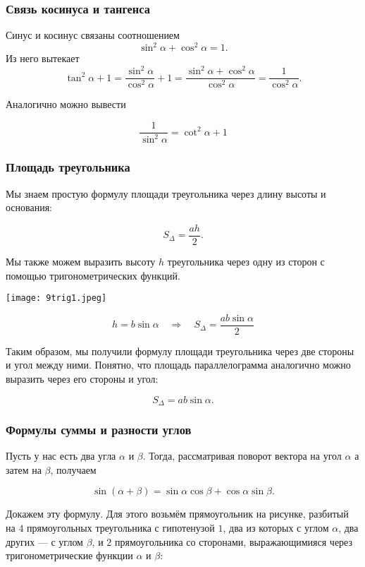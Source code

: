 \documentclass[12pt, a4paper]{article}%
\begin{document}
\subsubsection*{Связь косинуса и тангенса}
Синус и косинус связаны соотношением  
\[
\sin^2\alpha + \cos^2\alpha = 1.
\]
Из него вытекает  
\[
\tan^2\alpha + 1 = \frac{\sin^2\alpha}{\cos^2\alpha} + 1 = \frac{\sin^2\alpha + \cos^2\alpha}{\cos^2\alpha} = \frac{1}{\cos^2\alpha}.
\]

Аналогично можно вывести

\[
\frac{1}{\sin^2\alpha} = \cot^2\alpha + 1
\]

\subsubsection*{Площадь треугольника}

Мы знаем простую формулу площади треугольника через длину высоты и основания:

\[
S_\Delta = \frac{ah}{2}.
\]

Мы также можем выразить высоту $h$ треугольника через одну из сторон с помощью тригонометрических функций.

\begin{center}
\texttt{[image: 9trig1.jpeg]}
\label{fig:mpr}
\end{center}

\[
h = b\sin\alpha 
\quad\Longrightarrow\quad
S_\Delta = \frac{ab\sin\alpha}{2}
\]

Таким образом, мы получили формулу площади треугольника через две стороны и угол между ними. Понятно, что площадь параллелограмма аналогично можно выразить через его стороны и угол:

\[
S_\Delta = ab\sin\alpha.
\]


\subsubsection*{Формулы суммы и разности углов}
Пусть у нас есть два угла $\alpha$ и $\beta$. Тогда, рассматривая поворот вектора на угол $\alpha$ а затем на $\beta$, получаем

\[
\sin(\alpha + \beta) = \sin\alpha\cos\beta + \cos\alpha\sin\beta.
\]


Докажем эту формулу. Для этого возьмём прямоугольник на рисунке, разбитый на $4$ 
прямоугольных треугольника с гипотенузой $1$, два из которых с углом $\alpha$, два других
--- с углом $\beta$, и $2$ прямоугольника со сторонами, выражающимияся через тригонометрические
функции $\alpha$ и $\beta$:
\end{document}
